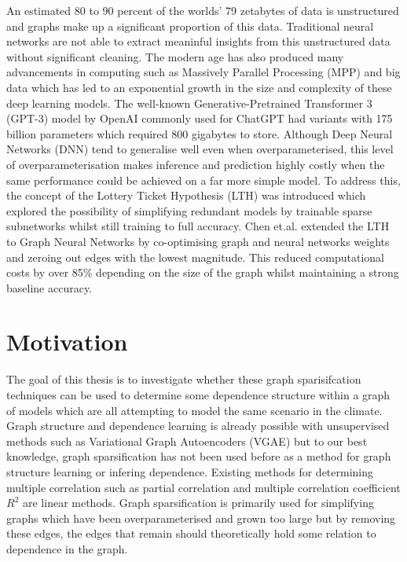 \documentclass[honours,12pt]{unswthesis}
\numberwithin{equation}{section}
\begin{document}
An estimated 80 to 90 percent of the worlds' 79 zetabytes of data is unstructured and graphs make up a significant proportion of this data\cite{inmon2007tapping}.
Traditional neural networks are not able to extract meaninful insights from this unstructured data without significant cleaning.
The modern age has also produced many advancements in computing such as Massively Parallel Processing (MPP)\cite{nordstrom1992using} 
and big data which has led to an exponential growth in the size and complexity of these deep learning models.
The well-known Generative-Pretrained Transformer 3 (GPT-3) model by OpenAI commonly used for ChatGPT had variants with 175 billion parameters which required 800 gigabytes to store.\cite{radford2018improving}
Although Deep Neural Networks (DNN) tend to generalise well even when overparameterised\cite{Cao_Gu_2020}, this level of overparameterisation makes inference 
and prediction highly costly when the same performance could be achieved on a far more simple model. To address this, the concept of the
Lottery Ticket Hypothesis (LTH)\cite{frankle2020linear} was introduced which explored the possibility of simplifying redundant models by trainable sparse subnetworks whilst still training to full accuracy.
Chen et.al.\cite{chen2021unified} extended the LTH to Graph Neural Networks by co-optimising graph and neural networks weights and zeroing out edges with the lowest magnitude. 
This reduced computational costs by over 85\% depending on the size of the graph whilst maintaining a strong baseline accuracy.

{\section{Motivation}}\label{motivation}

The goal of this thesis is to investigate whether these graph sparisifcation techniques can be used to determine some dependence structure within a graph of models which
are all attempting to model the same scenario in the climate. Graph structure and dependence learning is already possible with unsupervised methods such as Variational Graph Autoencoders (VGAE)\cite{pmlr-v97-yu19a}
but to our best knowledge, graph sparsification has not been used before as a method for graph structure learning or infering dependence. Existing methods for determining multiple correlation such as 
partial correlation and multiple correlation coefficient $R^2$ are linear methods. Graph sparsification is primarily used for simplifying graphs which have been overparameterised and grown too large but 
by removing these edges, the edges that remain should theoretically hold some relation to dependence in the graph.  
\end{document}

